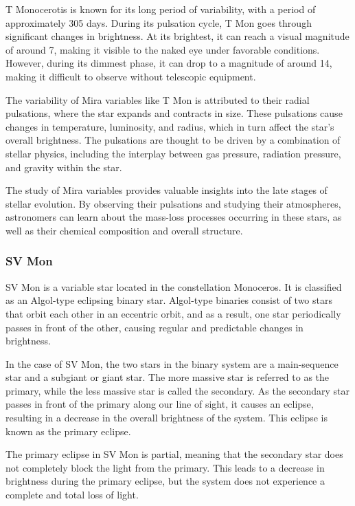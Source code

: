 T Monocerotis is known for its long period of variability, with a period of approximately 305 days. During its pulsation cycle, T Mon goes through significant changes in brightness. At its brightest, it can reach a visual magnitude of around 7, making it visible to the naked eye under favorable conditions. However, during its dimmest phase, it can drop to a magnitude of around 14, making it difficult to observe without telescopic equipment.

The variability of Mira variables like T Mon is attributed to their radial pulsations, where the star expands and contracts in size. These pulsations cause changes in temperature, luminosity, and radius, which in turn affect the star's overall brightness. The pulsations are thought to be driven by a combination of stellar physics, including the interplay between gas pressure, radiation pressure, and gravity within the star.

The study of Mira variables provides valuable insights into the late stages of stellar evolution. By observing their pulsations and studying their atmospheres, astronomers can learn about the mass-loss processes occurring in these stars, as well as their chemical composition and overall structure.

\subsubsection*{ SV Mon }
SV Mon is a variable star located in the constellation Monoceros. It is classified as an Algol-type eclipsing binary star. Algol-type binaries consist of two stars that orbit each other in an eccentric orbit, and as a result, one star periodically passes in front of the other, causing regular and predictable changes in brightness.

In the case of SV Mon, the two stars in the binary system are a main-sequence star and a subgiant or giant star. The more massive star is referred to as the primary, while the less massive star is called the secondary. As the secondary star passes in front of the primary along our line of sight, it causes an eclipse, resulting in a decrease in the overall brightness of the system. This eclipse is known as the primary eclipse.

The primary eclipse in SV Mon is partial, meaning that the secondary star does not completely block the light from the primary. This leads to a decrease in brightness during the primary eclipse, but the system does not experience a complete and total loss of light.

